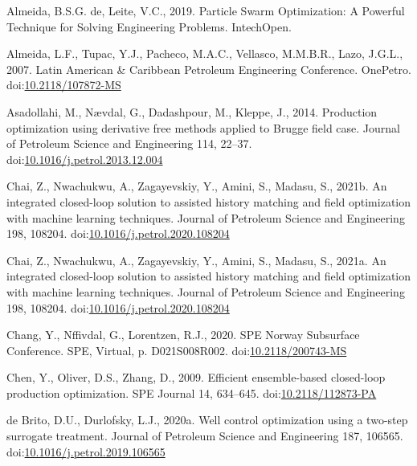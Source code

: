 \documentclass[]{elsarticle} %
\newlength{\cslhangindent}
\newenvironment{CSLReferences}[2] %
 {%
  \setlength{\parindent}{0pt}
  \ifodd #1 \everypar{\setlength{\hangindent}{\cslhangindent}}\ignorespaces\fi
  \ifnum #2 > 0
  \setlength{\parskip}{#2\baselineskip}
  \fi
 }%
 {}
\begin{document}
\hypertarget{refs}{}
\begin{CSLReferences}{1}{0}
\leavevmode{}%
Almeida, B.S.G. de, Leite, V.C., 2019. Particle Swarm Optimization: A Powerful Technique for Solving Engineering Problems. IntechOpen.

\leavevmode{}%
Almeida, L.F., Tupac, Y.J., Pacheco, M.A.C., Vellasco, M.M.B.R., Lazo, J.G.L., 2007. Latin American \& Caribbean Petroleum Engineering Conference. OnePetro. doi:\href{https://doi.org/10.2118/107872-MS}{10.2118/107872-MS}

\leavevmode{}%
Asadollahi, M., Nævdal, G., Dadashpour, M., Kleppe, J., 2014. Production optimization using derivative free methods applied to Brugge field case. Journal of Petroleum Science and Engineering 114, 22--37. doi:\href{https://doi.org/10.1016/j.petrol.2013.12.004}{10.1016/j.petrol.2013.12.004}

\leavevmode{}%
Chai, Z., Nwachukwu, A., Zagayevskiy, Y., Amini, S., Madasu, S., 2021b. An integrated closed-loop solution to assisted history matching and field optimization with machine learning techniques. Journal of Petroleum Science and Engineering 198, 108204. doi:\href{https://doi.org/10.1016/j.petrol.2020.108204}{10.1016/j.petrol.2020.108204}

\leavevmode{}%
Chai, Z., Nwachukwu, A., Zagayevskiy, Y., Amini, S., Madasu, S., 2021a. An integrated closed-loop solution to assisted history matching and field optimization with machine learning techniques. Journal of Petroleum Science and Engineering 198, 108204. doi:\href{https://doi.org/10.1016/j.petrol.2020.108204}{10.1016/j.petrol.2020.108204}

\leavevmode{}%
Chang, Y., Nffivdal, G., Lorentzen, R.J., 2020. SPE Norway Subsurface Conference. SPE, Virtual, p. D021S008R002. doi:\href{https://doi.org/10.2118/200743-MS}{10.2118/200743-MS}

\leavevmode{}%
Chen, Y., Oliver, D.S., Zhang, D., 2009. Efficient ensemble-based closed-loop production optimization. SPE Journal 14, 634--645. doi:\href{https://doi.org/10.2118/112873-PA}{10.2118/112873-PA}

\leavevmode{}%
de Brito, D.U., Durlofsky, L.J., 2020a. Well control optimization using a two-step surrogate treatment. Journal of Petroleum Science and Engineering 187, 106565. doi:\href{https://doi.org/10.1016/j.petrol.2019.106565}{10.1016/j.petrol.2019.106565}


\end{CSLReferences}
\end{document}

